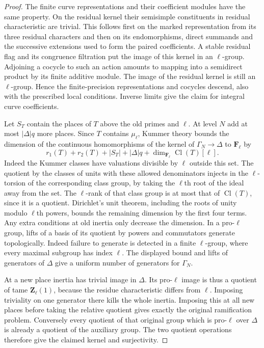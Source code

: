\documentclass[a4paper,11pt]{article}
\theoremstyle{definition}
\theoremstyle{remark}
\numberwithin{equation}{section}
\newcommand{\Cl}{\operatorname{Cl}}
\begin{document}
\begin{proof}
The finite curve representations and their coefficient modules
have the same property. On the residual kernel their semisimple
constituents in residual characteristic are trivial. This
follows first on the marked representation from its three
residual characters and then on its endomorphisms, direct
summands and the successive extensions used to form the
paired coefficients. A stable residual flag and its congruence
filtration put the image of this kernel in an \(\ell\)-group.
Adjoining a cocycle to such an action amounts to mapping into
a semidirect product by its finite additive module. The
image of the residual kernel is still an \(\ell\)-group.
Hence the finite-precision representations and cocycles
descend, also with the prescribed local conditions.
Inverse limits give the claim for integral curve coefficients.

Let \(S_T\) contain the places of \(T\) above the old primes
and \(\ell\). At level \(N\) add at most \(|\Delta|q\) more
places. Since \(T\) contains \(\mu_\ell\), Kummer theory
bounds the dimension of the continuous homomorphisms of the
kernel of \(\Gamma_N\to\Delta\) to \(\mathbf F_\ell\) by
\[
   r_1(T)+r_2(T)+|S_T|+|\Delta|q+
                         \dim_{\mathbf F_\ell}\Cl(T)[\ell].
\]
Indeed the Kummer classes have valuations divisible by
\(\ell\) outside this set. The quotient by the classes of
units with these allowed denominators injects in the
\(\ell\)-torsion of the corresponding class group, by taking
the \(\ell\)th root of the ideal away from the set. The
\(\ell\)-rank of that class group is at most that of
\(\Cl(T)\), since it is a quotient. Dirichlet's unit theorem,
including the roots of unity modulo \(\ell\)th powers,
bounds the remaining dimension by the first four terms.
Any extra conditions at old inertia only decrease the
dimension. In a pro-\(\ell\) group, lifts of a basis of its
quotient by powers and commutators generate topologically.
Indeed failure to generate is detected in a finite
\(\ell\)-group, where every maximal subgroup has index
\(\ell\). The displayed bound and lifts of generators of
\(\Delta\) give a uniform number of generators for
\(\Gamma_N\).

At a new place inertia has trivial image in \(\Delta\).
Its pro-\(\ell\) image is thus a quotient of tame
\(\mathbf Z_\ell(1)\), because the residue characteristic
differs from \(\ell\). Imposing triviality on one generator
there kills the whole inertia. Imposing this at all new
places before taking the relative quotient gives exactly
the original ramification problem. Conversely every quotient
of that original group which is pro-\(\ell\) over \(\Delta\)
is already a quotient of the auxiliary group. The two
quotient operations therefore give the claimed kernel
and surjectivity.
\end{proof}
\end{document}
